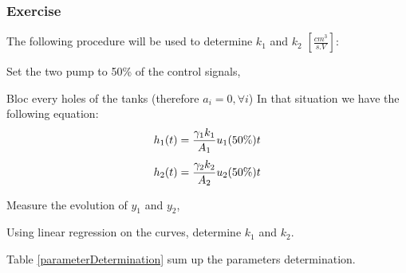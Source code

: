 \subsubsection{Exercise}

The following procedure will be used to determine $k_1$ and $k_2$ $\left[\frac{cm^3}{s.V}\right]$:

\begin{shortitemize}
    \item Set the two pump to 50\% of the control signals,
    \item Bloc every holes of the tanks (therefore $a_i = 0, \forall i$)
        In that situation we have the following equation:
            $$
            h_1(t) = \frac{\gamma_1k_1}{A_1}u_1(50\%)t \\
            $$
            $$
            h_2(t) = \frac{\gamma_2k_2}{A_2}u_2(50\%)t \\
            $$
    \item Measure the evolution of $y_1$ and $y_2$,
    \item Using linear regression on the curves, determine $k_1$ and $k_2$.
\end{shortitemize}

Table \ref{parameterDetermination} sum up the parameters determination.

